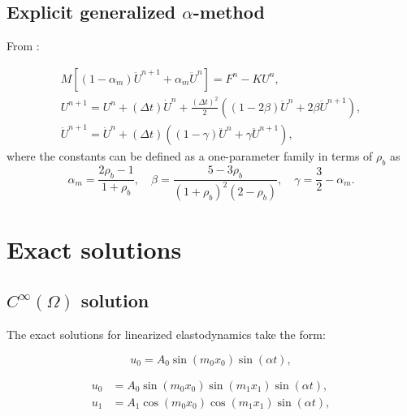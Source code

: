 \documentclass[12pt]{article}
\begin{document}
\subsection{Explicit generalized $\alpha$-method}

From \cite{Hulbert1996}:

\begin{eqnarray}
M[(1-\alpha_m)\ddot{U}^{n+1} + \alpha_m \ddot{U}^n]
= F^n - KU^n, 
%
\\
%
U^{n+1} = U^n + (\Delta t)\dot{U}^n + \frac{(\Delta t)^2}{2} 
\left( (1-2\beta)\ddot{U}^n + 2\beta \ddot{U}^{n+1}\right),
%
\\
%
\dot{U}^{n+1} = \dot{U}^n + (\Delta t)((1-\gamma)\ddot{U}^n + \gamma \ddot{U}^{n+1}),
\end{eqnarray}
%
where the constants can be defined as a one-parameter family in terms
of $\rho_b$ as
\begin{equation}
\alpha_m = \frac{2\rho_b-1}{1+\rho_b},
\quad
\beta = \frac{5-3\rho_b}{(1+\rho_b)^2(2-\rho_b)},
\quad
\gamma = \frac{3}{2}-\alpha_m.
\end{equation}

\section{Exact solutions}


\subsection{$C^\infty(\Omega)$ solution}

The exact solutions for linearized elastodynamics take the form:

\begin{equation}
u_0 = A_0 \sin (m_0 x_0) \sin (\alpha t),
\end{equation}

\begin{subequations}
\begin{align}
u_0 &= A_0 \sin (m_0 x_0) \sin (m_1 x_1) \sin (\alpha t), \\
u_1 &= A_1 \cos (m_0 x_0) \cos (m_1 x_1) \sin (\alpha t), 
\end{align}
\end{subequations}
\end{document}
